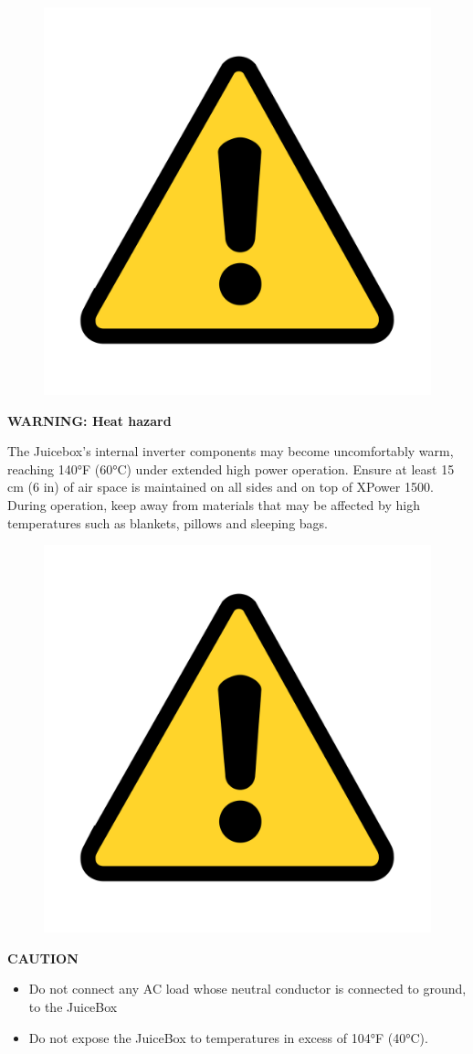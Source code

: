 \documentclass[10pt]{article}
\begin{document}
\begin{figure}
    \centering
    \includegraphics[width=.75in]{warning_y}
\end{figure}

\vspace{5mm}

\noindent   
\Large{\textbf{WARNING: Heat hazard}} \\ %
\begin{large}
	The Juicebox's internal inverter components may become uncomfortably warm,
	reaching 140°F (60°C) under extended high power operation. Ensure at least
	15 cm (6 in) of air space is maintained on all sides and on top of XPower 1500.
	During operation, keep away from materials that may be affected by high
	temperatures such as blankets, pillows and sleeping bags.
\end{large}


\begin{figure}
    \centering
    \includegraphics[width=.75in]{warning_y}
\end{figure}

\vspace{5mm}

\noindent   
\Large{\textbf{CAUTION}} \\
\begin{large}                                        
	\begin{itemize}
		\item{Do not connect any AC load whose neutral conductor is connected to ground,
			to the JuiceBox}
		\item{Do not expose the JuiceBox to temperatures in excess of 104°F (40°C).}
	\end{itemize}
\end{large}

\newpage
\tableofcontents

\newpage
{} %
\setcounter{page}{1} %
\end{document}

